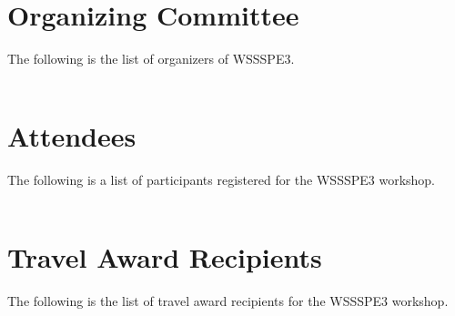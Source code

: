 \documentclass[11pt, oneside]{amsart}
\newcommand{\todo}[1]{{\color{blue}$\blacksquare$~\textsf{[TODO: #1]}}}
\begin{document}
\section{Organizing Committee}  \label{sec:orgcom}

The following is the list of organizers of WSSSPE3.

{\scriptsize
\begin{longtable}{lll}

\end{longtable}
}
 

\section{Attendees}  \label{sec:attendees}
The following is a list of participants registered for the WSSSPE3 workshop.

{\scriptsize
\begin{longtable}{lll}

\end{longtable}
}

\section{Travel Award Recipients}  \label{sec:awardees}
The following is the list of travel award recipients for the WSSSPE3 workshop.

{\scriptsize
\begin{longtable}{lll}

\end{longtable}
}




%

%










\end{document}
